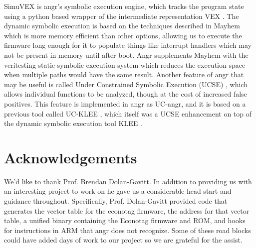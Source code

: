 \documentclass[letterpaper, 10 pt, conference]{ieeeconf}
\begin{document}
SimuVEX is angr's symbolic execution engine, which tracks the program state using a python based wrapper \cite{pyvex} of the intermediate representation VEX \cite{vex}. The dynamic symbolic execution is based on the techniques described in Mayhem \cite{mayhem} which is more memory efficient than other options, allowing us to execute the firmware long enough for it to populate things like interrupt handlers which may not be present in memory until after boot. Angr supplements Mayhem with the veritesting static symbolic execution system \cite{veritesting} which reduces the execution space when multiple paths would have the same result. Another feature of angr that may be useful is called Under Constrained Symbolic Execution (UCSE) \cite{ucklee2}, which allows individual functions to be analyzed, though at the cost of increased false positives. This feature is implemented in angr as UC-angr, and it is based on a previous tool called UC-KLEE \cite{ucklee1}, which itself was a UCSE enhancement on top of the dynamic symbolic execution tool KLEE \cite{klee}.

\section{Acknowledgements}
We’d like to thank Prof. Brendan Dolan-Gavitt. In addition to providing us with an interesting project to work on he gave us a considerable head start and guidance throughout. Specifically, Prof. Dolan-Gavitt provided code that generates the vector table for the econotag firmware, the address for that vector table, a unified binary containing the Econotag firmware and ROM, and hooks for instructions in ARM that angr does not recognize. Some of these road blocks could have added days of work to our project so we are grateful for the assist.

{}

\end{document}
